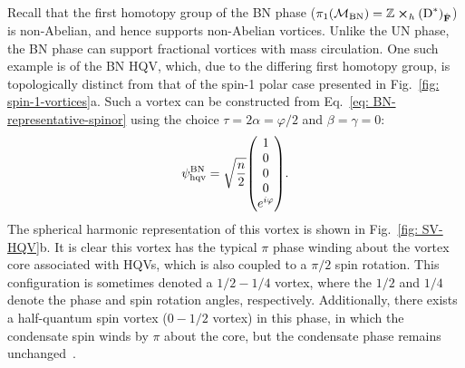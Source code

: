 Recall that the first homotopy group of the BN phase
(\(\pi_1(\mathcal{M}_\text{BN})=\mathbb{Z} \cross_h
{(\text{D}^*)}_{\hat{\vb{F}}}\)) is non-Abelian, and hence supports non-Abelian
vortices.
Unlike the UN phase, the BN phase can support fractional vortices with mass
circulation.
One such example is of the BN HQV, which, due to the differing first homotopy
group, is topologically distinct from that of the spin-1 polar case
presented in Fig.~\ref{fig: spin-1-vortices}a.
Such a vortex can be constructed from Eq.~\eqref{eq: BN-representative-spinor}
using the choice \(\tau=2\alpha=\varphi/2\) and \(\beta=\gamma=0\):
\begin{equation}
    \psi^\text{BN}_\text{hqv} = \sqrt{\frac{n}{2}}\mqty(
    1 \\
    0 \\
    0 \\
    0 \\
    e^{i\varphi}
    ).
\end{equation}
The spherical harmonic representation of this vortex is shown in
Fig.~\ref{fig: SV-HQV}b.
It is clear this vortex has the typical \(\pi \) phase winding about the vortex
core associated with HQVs, which is also coupled to a \(\pi / 2\) spin rotation.
This configuration is sometimes denoted a \(1/2-1/4\) vortex, where the \(1/2\)
and \(1/4\) denote the phase and spin rotation angles, respectively.
Additionally, there exists a half-quantum spin vortex (\(0 - 1/2\) vortex) in
this phase, in which the condensate spin winds by \(\pi \) about the core,
but the condensate phase remains unchanged~\cite{Kawaguchi2012}.

